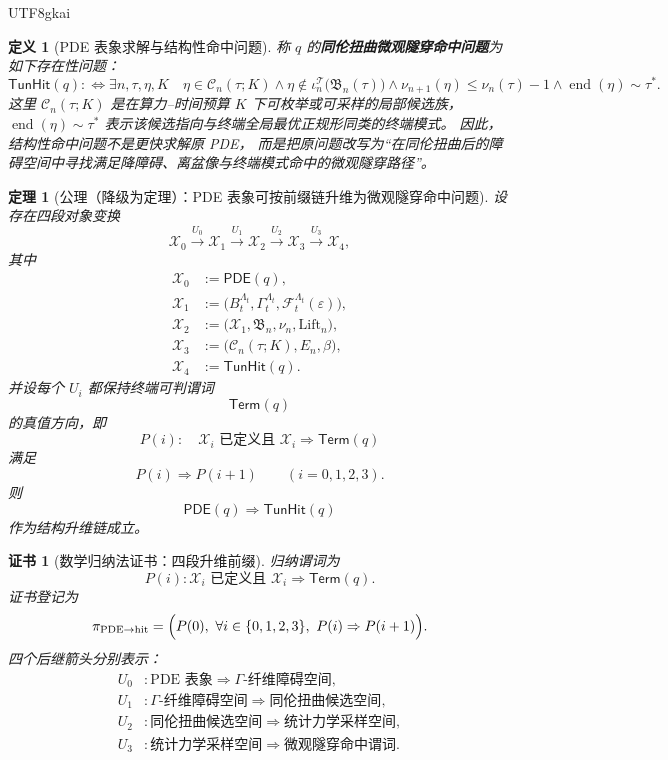 \documentclass[12pt]{article}
\newtheorem{definition}{定义}[section]
\newtheorem{theorem}{定理}[section]
\newtheorem{Certificate}{证书}[section]
\begin{document}
\begin{CJK*}{UTF8}{gkai}
\begin{definition}[PDE 表象求解与结构性命中问题]
称 \(q\) 的\textbf{同伦扭曲微观隧穿命中问题}为如下存在性问题：
\[
  \mathsf{TunHit}(q)
  :
  \Longleftrightarrow
  \exists n,\tau,\eta,K
  \quad
  \eta\in\mathcal C_n(\tau;K)
  \wedge
  \eta\notin\iota_n^{\mathcal T}\bigl(\mathfrak B_n(\tau)\bigr)
  \wedge
  \nu_{n+1}(\eta)\le\nu_n(\tau)-1
  \wedge
  \operatorname{end}(\eta)\sim\tau^\ast.
\]
这里 \(\mathcal C_n(\tau;K)\) 是在算力--时间预算 \(K\) 下可枚举或可采样的局部候选族，
\(\operatorname{end}(\eta)\sim\tau^\ast\) 表示该候选指向与终端全局最优正规形同类的终端模式。
因此，结构性命中问题不是更快求解原 PDE，
而是把原问题改写为“在同伦扭曲后的障碍空间中寻找满足降障碍、离盆像与终端模式命中的微观隧穿路径”。
\end{definition}

\begin{theorem}[公理（降级为定理）：PDE 表象可按前缀链升维为微观隧穿命中问题]
\label{thm:tex1-ch5-pde-uplift-induction}
设存在四段对象变换
\[
  \mathcal X_0
  \xrightarrow{U_0}
  \mathcal X_1
  \xrightarrow{U_1}
  \mathcal X_2
  \xrightarrow{U_2}
  \mathcal X_3
  \xrightarrow{U_3}
  \mathcal X_4,
\]
其中
\[
\begin{aligned}
  \mathcal X_0&:=\mathsf{PDE}(q),\\
  \mathcal X_1&:=\bigl(B_t^{\Lambda_t},\Gamma_t^{\Lambda_t},\mathcal F_t^{\Lambda_t}(\varepsilon)\bigr),\\
  \mathcal X_2&:=\bigl(\mathcal X_1,\mathfrak B_n,\nu_n,\mathrm{Lift}_n\bigr),\\
  \mathcal X_3&:=\bigl(\mathcal C_n(\tau;K),E_n,\beta\bigr),\\
  \mathcal X_4&:=\mathsf{TunHit}(q).
\end{aligned}
\]
并设每个 \(U_i\) 都保持终端可判谓词
\[
  \mathsf{Term}(q)
\]
的真值方向，即
\[
  P(i):\quad
  \mathcal X_i\text{ 已定义且 }
  \mathcal X_i\Rightarrow \mathsf{Term}(q)
\]
满足
\[
  P(i)\Rightarrow P(i+1)
  \qquad (i=0,1,2,3).
\]
则
\[
  \mathsf{PDE}(q)
  \Longrightarrow
  \mathsf{TunHit}(q)
\]
作为结构升维链成立。
\end{theorem}

\begin{Certificate}[数学归纳法证书：四段升维前缀]
\label{cert:tex1-ch5-pde-uplift-induction}
归纳谓词为
\[
  P(i):
  \mathcal X_i\text{ 已定义且 }
  \mathcal X_i\Rightarrow\mathsf{Term}(q).
\]
证书登记为
\[
  \pi_{\mathrm{PDE}\to\mathrm{hit}}
  =
  \Bigl(
    P(0),\
    \forall i\in\{0,1,2,3\},\ P(i)\Rightarrow P(i+1)
  \Bigr).
\]
四个后继箭头分别表示：
\[
\begin{aligned}
  U_0 &: \text{PDE 表象}\Rightarrow \Gamma\text{-纤维障碍空间},\\
  U_1 &: \Gamma\text{-纤维障碍空间}\Rightarrow \text{同伦扭曲候选空间},\\
  U_2 &: \text{同伦扭曲候选空间}\Rightarrow \text{统计力学采样空间},\\
  U_3 &: \text{统计力学采样空间}\Rightarrow \text{微观隧穿命中谓词}.
\end{aligned}
\]
\end{Certificate}


\end{CJK*}
\end{document}
